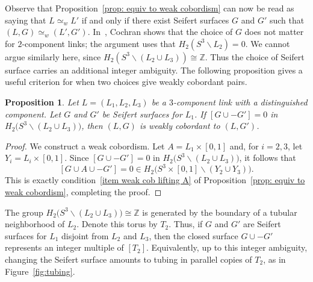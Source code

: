 \documentclass[a4paper, 11pt]{amsart}
\newtheorem{proposition}[theorem]{Proposition}
\theoremstyle{definition}
\newcommand{\Z}{\mathbb{Z}}
\begin{document}
Observe that Proposition~\ref{prop: equiv to weak cobordism} can now be read as saying that $L\simeq_w L'$ if and only if there exist Seifert surfaces $G$ and $G'$ such that $(L,G)\simeq_w (L',G')$. In~\cite[Proposition~3.3]{C3}, Cochran shows that the choice of $G$ does not matter for $2$-component links; the argument uses that $H_2(S^3\smallsetminus L_2)=0$. We cannot argue similarly here, since
$H_2(S^3\smallsetminus (L_2\cup L_3))\cong \Z$.
Thus the choice of Seifert surface carries an additional integer ambiguity. The
following proposition gives a useful criterion for when two choices give weakly cobordant pairs.



\begin{proposition}\label{prop: When are surfaces weak cob}
Let $L=(L_1, L_2, L_3)$ be a $3$-component link with a distinguished component. Let $G$ and $G'$ be Seifert surfaces for $L_1$.
If $[G\cup -G']=0$ in $H_2\bigl(S^3\smallsetminus (L_2\cup L_3)\bigr)$, then $(L,G)$ is weakly cobordant to $(L,G')$.
\end{proposition}

\begin{proof}
We construct a weak cobordism. Let $A=L_1\times[0,1]$ and, for $i=2,3$, let $Y_i=L_i\times[0,1]$. Since $[G\cup -G']=0$ in $H_2\bigl(S^3\smallsetminus (L_2\cup L_3)\bigr)$, it follows that
\[
[G\cup A\cup -G']=0 \in H_2\bigl(S^3\times[0,1]\smallsetminus (Y_2\cup Y_3)\bigr).
\]
This is exactly condition~\ref{item weak cob lifting A} of Proposition~\ref{prop: equiv to weak cobordism}, completing the proof.
\end{proof}



 The group $H_2\bigl(S^3\smallsetminus (L_2\cup L_3)\bigr)\cong \Z$ is generated by the boundary of a tubular neighborhood of $L_2$. Denote this torus by $T_2$. Thus, if $G$ and $G'$ are Seifert surfaces for $L_1$ disjoint from $L_2$ and $L_3$, then the closed surface $G\cup -G'$ represents an integer multiple of $[T_2]$. Equivalently, up to this integer ambiguity, changing the Seifert surface amounts to tubing in parallel copies of $T_2$, as in Figure~\ref{fig:tubing}.
\end{document}
